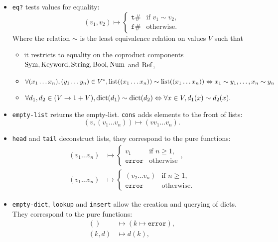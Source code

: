 \begin{itemize}
\item \texttt{eq?} tests values for equality:
  \[
    (v_1, v_2) \mapsto
    \begin{cases}
      \mathtt{t}\# & \text{if } v_1 \sim v_2,\\
      \mathtt{f}\# & \text{otherwise.}
    \end{cases}
  \]
  Where the relation $\sim$ is the least equivalence relation on values $V$ such
  that
  \begin{itemize}
  \item
    it restricts to equality on the coproduct components $\mathrm{Sym}, \mathrm{Keyword}, \mathrm{String},
    \mathrm{Bool}, \mathrm{Num}$ and $\mathrm{Ref}$,
  \item
    $\forall (x_1 \ldots x_n), (y_1 \ldots y_n) \in V^*, \mathrm{list}((x_1 \ldots
    x_n)) \sim \mathrm{list}((x_1 \ldots x_n)) \Leftrightarrow x_1 \sim y_1, \ldots, x_n
    \sim y_n$
  \item
    $\forall d_1, d_2 \in (V \to 1 + V), \mathrm{dict}(d_1) \sim \mathrm{dict}(d_2)
    \Leftrightarrow \forall x \in V, d_1(x) \sim d_2(x).$
  \end{itemize}
\item
  \texttt{empty-list} returns the empty-list.
  \texttt{cons} adds elements to the front of lists:
  \[
    (v, (v_1 \ldots v_n)) \mapsto (v v_1 \ldots v_n).
  \]
\item
  \texttt{head} and \texttt{tail} deconstruct lists, they correspond to the pure
  functions:
  \begin{align*}
    (v_1 \ldots v_n) &\mapsto
    \begin{cases}
      v_1 & \text{if } n \geq 1,\\
      \mathtt{error} & \text{otherwise}
    \end{cases},\\
    (v_1 \ldots v_n) &\mapsto
    \begin{cases}
      (v_2 \ldots v_n) & \text{if } n \geq 1,\\
      \mathtt{error} & \text{otherwise.}
    \end{cases}
  \end{align*}
\item \texttt{empty-dict}, \texttt{lookup} and \texttt{insert} allow the
  creation and querying of dicts. They correspond to the pure functions:
  \begin{align*}
    () &\mapsto (k \mapsto \mathtt{error}),\\
    (k, d) &\mapsto d(k),\\

\end{align*}
\end{itemize}
